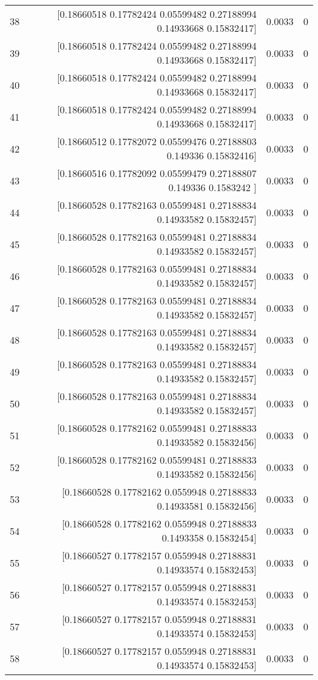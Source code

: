 \begin{longtable}{lrrr}
38 & [0.18660518 0.17782424 0.05599482 0.27188994 0.14933668 0.15832417] & 0.0033 & 0 \\
39 & [0.18660518 0.17782424 0.05599482 0.27188994 0.14933668 0.15832417] & 0.0033 & 0 \\
40 & [0.18660518 0.17782424 0.05599482 0.27188994 0.14933668 0.15832417] & 0.0033 & 0 \\
41 & [0.18660518 0.17782424 0.05599482 0.27188994 0.14933668 0.15832417] & 0.0033 & 0 \\
42 & [0.18660512 0.17782072 0.05599476 0.27188803 0.149336   0.15832416] & 0.0033 & 0 \\
43 & [0.18660516 0.17782092 0.05599479 0.27188807 0.149336   0.1583242 ] & 0.0033 & 0 \\
44 & [0.18660528 0.17782163 0.05599481 0.27188834 0.14933582 0.15832457] & 0.0033 & 0 \\
45 & [0.18660528 0.17782163 0.05599481 0.27188834 0.14933582 0.15832457] & 0.0033 & 0 \\
46 & [0.18660528 0.17782163 0.05599481 0.27188834 0.14933582 0.15832457] & 0.0033 & 0 \\
47 & [0.18660528 0.17782163 0.05599481 0.27188834 0.14933582 0.15832457] & 0.0033 & 0 \\
48 & [0.18660528 0.17782163 0.05599481 0.27188834 0.14933582 0.15832457] & 0.0033 & 0 \\
49 & [0.18660528 0.17782163 0.05599481 0.27188834 0.14933582 0.15832457] & 0.0033 & 0 \\
50 & [0.18660528 0.17782163 0.05599481 0.27188834 0.14933582 0.15832457] & 0.0033 & 0 \\
51 & [0.18660528 0.17782162 0.05599481 0.27188833 0.14933582 0.15832456] & 0.0033 & 0 \\
52 & [0.18660528 0.17782162 0.05599481 0.27188833 0.14933582 0.15832456] & 0.0033 & 0 \\
53 & [0.18660528 0.17782162 0.0559948  0.27188833 0.14933581 0.15832456] & 0.0033 & 0 \\
54 & [0.18660528 0.17782162 0.0559948  0.27188833 0.1493358  0.15832454] & 0.0033 & 0 \\
55 & [0.18660527 0.17782157 0.0559948  0.27188831 0.14933574 0.15832453] & 0.0033 & 0 \\
56 & [0.18660527 0.17782157 0.0559948  0.27188831 0.14933574 0.15832453] & 0.0033 & 0 \\
57 & [0.18660527 0.17782157 0.0559948  0.27188831 0.14933574 0.15832453] & 0.0033 & 0 \\
58 & [0.18660527 0.17782157 0.0559948  0.27188831 0.14933574 0.15832453] & 0.0033 & 0 \\

\end{longtable}
